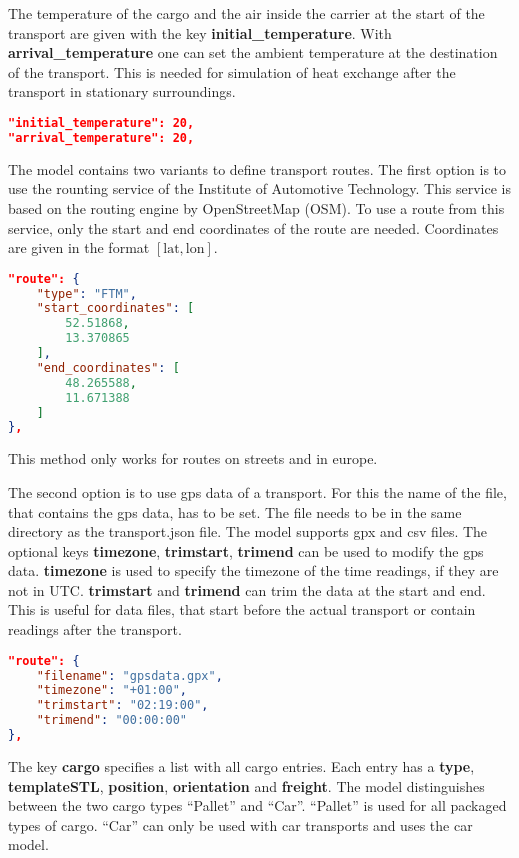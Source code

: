 \documentclass[%
FTMstudentthesis%
,optArial%
,optBiber%
,optEnglish%
,optCMYK%
]{FTMlatex}%
\def\ContinueLineNumber{\lstset{firstnumber=last}}
\begin{document}
The temperature of the cargo and the air inside the carrier at the start of the transport are given with the key \textbf{initial\_temperature}. With \textbf{arrival\_temperature} one can set the ambient temperature at the destination of the transport. This is needed for simulation of heat exchange after the transport in stationary surroundings.%
\begin{code}
\ContinueLineNumber
\begin{lstlisting}[language=json]
"initial_temperature": 20,
"arrival_temperature": 20,
\end{lstlisting}
\end{code}
%
The model contains two variants to define transport routes. The first option is to use the rounting service of the Institute of Automotive Technology. This service is based on the routing engine by OpenStreetMap (OSM). To use a route from this service, only the start and end coordinates of the route are needed. Coordinates are given in the format $[\textrm{lat}, \textrm{lon}]$.

\begin{code}
\ContinueLineNumber
\begin{lstlisting}[language=json]
"route": {
	"type": "FTM",
	"start_coordinates": [
		52.51868,
		13.370865
	],
	"end_coordinates": [
		48.265588,
		11.671388
	]
},
\end{lstlisting}
\end{code}
%
This method only works for routes on streets and in europe.%

The second option is to use gps data of a transport. For this the name of the file, that contains the gps data, has to be set. The file needs to be in the same directory as the transport.json file. The model supports gpx and csv files. The optional keys \textbf{timezone}, \textbf{trimstart}, \textbf{trimend} can be used to modify the gps data. \textbf{timezone} is used to specify the timezone of the time readings, if they are not in UTC. \textbf{trimstart} and \textbf{trimend} can trim the data at the start and end. This is useful for data files, that start before the actual transport or contain readings after the transport. 

\begin{code}
\ContinueLineNumber
\begin{lstlisting}[language=json]
"route": {
	"filename": "gpsdata.gpx",
	"timezone": "+01:00",
	"trimstart": "02:19:00",
	"trimend": "00:00:00"
},
\end{lstlisting}
\end{code}
%
The key  \textbf{cargo} specifies a list with all cargo entries. Each entry has a \textbf{type}, \textbf{templateSTL}, \textbf{position}, \textbf{orientation} and  \textbf{freight}. The model distinguishes between the two cargo types ``Pallet'' and ``Car''. ``Pallet'' is used for all packaged types of cargo. ``Car'' can only be used with car transports and uses the car model.%
\end{document}
